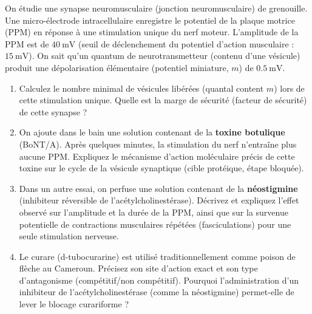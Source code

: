 \documentclass[11pt]{article}
\begin{document}
\begin{exercice}
On étudie une synapse neuromusculaire (jonction neuromusculaire) de grenouille. Une micro-électrode intracellulaire enregistre le potentiel de la plaque motrice (PPM) en réponse à une stimulation unique du nerf moteur. L'amplitude de la PPM est de $\SI{40}{\milli\volt}$ (seuil de déclenchement du potentiel d'action musculaire : $\SI{15}{\milli\volt}$). On sait qu'un quantum de neurotransmetteur (contenu d'une vésicule) produit une dépolarisation élémentaire (potentiel miniature, $m$) de $\SI{0,5}{\milli\volt}$.
\begin{enumerate}
    \item Calculez le nombre minimal de vésicules libérées (quantal content $m$) lors de cette stimulation unique. Quelle est la marge de sécurité (facteur de sécurité) de cette synapse ?
    \item On ajoute dans le bain une solution contenant de la \textbf{toxine botulique} (BoNT/A). Après quelques minutes, la stimulation du nerf n'entraîne plus aucune PPM. Expliquez le mécanisme d'action moléculaire précis de cette toxine sur le cycle de la vésicule synaptique (cible protéique, étape bloquée).
    \item Dans un autre essai, on perfuse une solution contenant de la \textbf{néostigmine} (inhibiteur réversible de l'acétylcholinestérase). Décrivez et expliquez l'effet observé sur l'amplitude et la durée de la PPM, ainsi que sur la survenue potentielle de contractions musculaires répétées (fasciculations) pour une seule stimulation nerveuse.
    \item Le curare (d-tubocurarine) est utilisé traditionnellement comme poison de flèche au Cameroun. Précisez son site d'action exact et son type d'antagonisme (compétitif/non compétitif). Pourquoi l'administration d'un inhibiteur de l'acétylcholinestérase (comme la néostigmine) permet-elle de lever le blocage curariforme ?
\end{enumerate}
\end{exercice}
\end{document}
